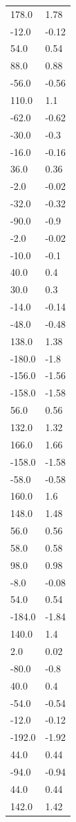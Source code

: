 \begin{longtable}{ll}
178.0 & 1.78 \\
-12.0 & -0.12 \\
54.0 & 0.54 \\
88.0 & 0.88 \\
-56.0 & -0.56 \\
110.0 & 1.1 \\
-62.0 & -0.62 \\
-30.0 & -0.3 \\
-16.0 & -0.16 \\
36.0 & 0.36 \\
-2.0 & -0.02 \\
-32.0 & -0.32 \\
-90.0 & -0.9 \\
-2.0 & -0.02 \\
-10.0 & -0.1 \\
40.0 & 0.4 \\
30.0 & 0.3 \\
-14.0 & -0.14 \\
-48.0 & -0.48 \\
138.0 & 1.38 \\
-180.0 & -1.8 \\
-156.0 & -1.56 \\
-158.0 & -1.58 \\
56.0 & 0.56 \\
132.0 & 1.32 \\
166.0 & 1.66 \\
-158.0 & -1.58 \\
-58.0 & -0.58 \\
160.0 & 1.6 \\
148.0 & 1.48 \\
56.0 & 0.56 \\
58.0 & 0.58 \\
98.0 & 0.98 \\
-8.0 & -0.08 \\
54.0 & 0.54 \\
-184.0 & -1.84 \\
140.0 & 1.4 \\
2.0 & 0.02 \\
-80.0 & -0.8 \\
40.0 & 0.4 \\
-54.0 & -0.54 \\
-12.0 & -0.12 \\
-192.0 & -1.92 \\
44.0 & 0.44 \\
-94.0 & -0.94 \\
44.0 & 0.44 \\
142.0 & 1.42 \\

\end{longtable}
